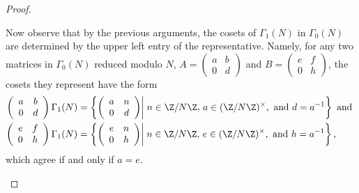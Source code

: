 \documentclass[10pt]{amsart}
\begin{document}
\begin{thm}
\begin{proof}
\begin{enumerate}[(a)]
      Now observe that by the previous arguments, the cosets of $\Gamma_1(N)$ in $\Gamma_0(N)$ are determined by the upper left entry of the representative.  Namely,
      for any two matrices in $\Gamma_0(N)$ reduced modulo $N$, $A = \left(
      \begin{array}{cc}
	a & b\\
	0 & d
      \end{array}\right)$ and $B = \left(
      \begin{array}{cc}
	e & f\\
	0 & h
      \end{array}\right)$, the cosets they represent have the form
      \begin{align*}
      \left(
      \begin{array}{cc}
	a & b\\
	0 & d
      \end{array}\right)\Gamma_1(N) &= \left\{
      \left(
      \begin{array}{cc}
	a & n\\
	0 & d
      \end{array}\right) \middle\vert\; n \in \Z/N\Z,\, a \in (\Z/N\Z)^{\times}, \text{ and } d = a^{-1} \right\} \text{ and } \\
      \left(
      \begin{array}{cc}
	e & f\\
	0 & h
      \end{array}\right)\Gamma_1(N) &= \left\{\left(
      \begin{array}{cc}
	e & n\\
	0 & h
      \end{array}\right) \middle\vert\; n \in \Z/N\Z,\, e \in (\Z/N\Z)^{\times}, \text{ and } h = a^{-1} \right\},
      \end{align*}
      which agree if and only if $a = e$.

\end{enumerate}
\end{proof}
\end{thm}
\end{document}
